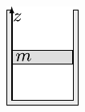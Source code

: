 \documentclass[../../main/main.tex]{subfiles}
\begin{document}
\begin{tcb*}[breakable]
\begin{minipage}[c]{.18\linewidth}
\begin{center}
{				\includegraphics[width=\linewidth]{piston_exo-plain}
			}{
}
\end{center}
\end{minipage}
\end{tcb*}
\end{document}
